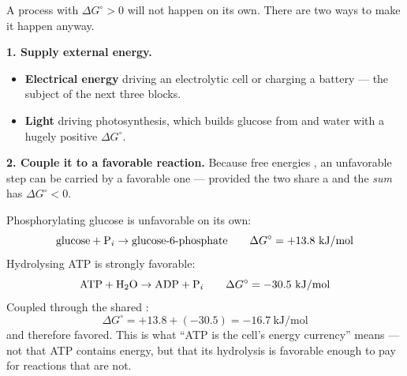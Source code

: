 \documentclass{apchem-notes}
\begin{document}


A process with $\Delta G^\circ > 0$ will not happen on its own. There are
two ways to make it happen anyway.

\textbf{1. Supply external energy.}
\begin{itemize}[leftmargin=*,itemsep=0.25em]
  \item \textbf{Electrical energy} driving an electrolytic cell or charging
        a battery --- the subject of the next three blocks.
  \item \textbf{Light} driving photosynthesis, which builds glucose from
         and water with a hugely positive $\Delta G^\circ$.
\end{itemize}

\textbf{2. Couple it to a favorable reaction.} Because free energies
, an unfavorable step can be carried by a favorable
one --- provided the two share a 
and the \emph{sum} has $\Delta G^\circ < 0$.

\begin{workedexample}
Phosphorylating glucose is unfavorable on its own:
\[ \text{glucose} + \ce{P_i} \to \text{glucose-6-phosphate}
   \qquad \Delta G^\circ = +13.8~\text{kJ/mol} \]
Hydrolysing ATP is strongly favorable:
\[ \ce{ATP} + \ce{H2O} \to \ce{ADP} + \ce{P_i}
   \qquad \Delta G^\circ = -30.5~\text{kJ/mol} \]
Coupled through the shared :
\[ \Delta G^\circ = +13.8 + (-30.5) = \mathbf{-16.7}~\text{kJ/mol} \]
and therefore favored. This is what ``ATP is the cell's energy currency''
means --- not that ATP contains energy, but that its hydrolysis is
favorable enough to pay for reactions that are not.
\end{workedexample}

\end{document}

